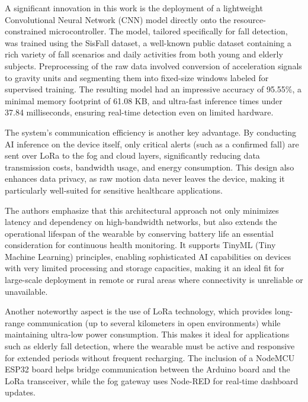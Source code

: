 \documentclass[a4paper, 12pt]{report}
\begin{document}
A significant innovation in this work is the deployment of a lightweight Convolutional Neural Network (CNN) model directly onto the resource-constrained microcontroller. The model, tailored specifically for fall detection, was trained using the SisFall dataset, a well-known public dataset containing a rich variety of fall scenarios and daily activities from both young and elderly subjects. Preprocessing of the raw data involved conversion of acceleration signals to gravity units and segmenting them into fixed-size windows labeled for supervised training. The resulting model had an impressive accuracy of 95.55\%, a minimal memory footprint of 61.08 KB, and ultra-fast inference times under 37.84 milliseconds, ensuring real-time detection even on limited hardware.

The system's communication efficiency is another key advantage. By conducting AI inference on the device itself, only critical alerts (such as a confirmed fall) are sent over LoRa to the fog and cloud layers, significantly reducing data transmission costs, bandwidth usage, and energy consumption. This design also enhances data privacy, as raw motion data never leaves the device, making it particularly well-suited for sensitive healthcare applications.

The authors emphasize that this architectural approach not only minimizes latency and dependency on high-bandwidth networks, but also extends the operational lifespan of the wearable by conserving battery life an essential consideration for continuous health monitoring. It supports TinyML (Tiny Machine Learning) principles, enabling sophisticated AI capabilities on devices with very limited processing and storage capacities, making it an ideal fit for large-scale deployment in remote or rural areas where connectivity is unreliable or unavailable.

Another noteworthy aspect is the use of LoRa technology, which provides long-range communication (up to several kilometers in open environments) while maintaining ultra-low power consumption. This makes it ideal for applications such as elderly fall detection, where the wearable must be active and responsive for extended periods without frequent recharging. The inclusion of a NodeMCU ESP32 board helps bridge communication between the Arduino board and the LoRa transceiver, while the fog gateway uses Node-RED for real-time dashboard updates.
\end{document}
